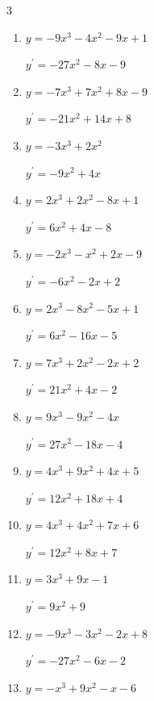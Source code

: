 \begin{multicols}{3}
\begin{enumerate}
        $\displaystyle y^{\prime}=18x^{2}+14x+3$

  \item $y=-9x^{3}-4x^{2}-9x+1$

        $\displaystyle y^{\prime}=-27x^{2}-8x-9$

  \item $y=-7x^{3}+7x^{2}+8x-9$

        $\displaystyle y^{\prime}=-21x^{2}+14x+8$

  \item $y=-3x^{3}+2x^{2}$

        $\displaystyle y^{\prime}=-9x^{2}+4x$

  \item $y=2x^{3}+2x^{2}-8x+1$

        $\displaystyle y^{\prime}=6x^{2}+4x-8$

  \item $y=-2x^{3}-x^{2}+2x-9$

        $\displaystyle y^{\prime}=-6x^{2}-2x+2$

  \item $y=2x^{3}-8x^{2}-5x+1$

        $\displaystyle y^{\prime}=6x^{2}-16x-5$

  \item $y=7x^{3}+2x^{2}-2x+2$

        $\displaystyle y^{\prime}=21x^{2}+4x-2$

  \item $y=9x^{3}-9x^{2}-4x$

        $\displaystyle y^{\prime}=27x^{2}-18x-4$

  \item $y=4x^{3}+9x^{2}+4x+5$

        $\displaystyle y^{\prime}=12x^{2}+18x+4$

  \item $y=4x^{3}+4x^{2}+7x+6$

        $\displaystyle y^{\prime}=12x^{2}+8x+7$

  \item $y=3x^{3}+9x-1$

        $\displaystyle y^{\prime}=9x^{2}+9$

  \item $y=-9x^{3}-3x^{2}-2x+8$

        $\displaystyle y^{\prime}=-27x^{2}-6x-2$

  \item $y=-x^{3}+9x^{2}-x-6$


\end{enumerate}
\end{multicols}
